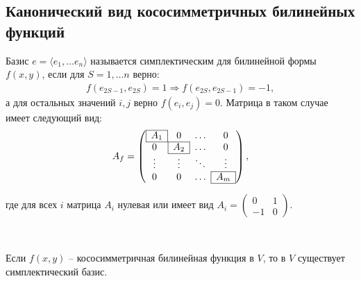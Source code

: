 \subsection{Канонический вид кососимметричных билинейных функций}

\begin{definition}
    Базис $e = \langle e_1, \dots e_n \rangle$ называется симплектическим для билинейной формы $f(x, y)$, 
    если для $S = 1,\dots n$ верно:
    \begin{gather*}
        f(e_{2S - 1}, e_{2S}) = 1 \Rightarrow f(e_{2S}, e_{2S-1}) = -1,
    \end{gather*} а для остальных значений $i, j$ верно $f(e_i, e_j) = 0$. 
    Матрица в таком случае имеет следующий вид: 
    \[A_f = \left(\begin{array}{@{}cccc@{}}
		\cline{1-1}
		\multicolumn{1}{|c|}{A_1} & 0 & \dots & 0\\
		\cline{1-2}
		0 & \multicolumn{1}{|c|}{A_2} & \dots & 0\\
		\cline{2-2}
		\vdots & \vdots & \ddots & \vdots\\
		\cline{4-4}
		0 & 0 & \dots & \multicolumn{1}{|c|}{A_m}\\
		\cline{4-4}
	\end{array}\right),\]
	
	где для всех $i$ матрица $A_i$ нулевая или имеет вид $A_i = 
    \begin{pmatrix}
        0  &1 \\
		-1 &0
    \end{pmatrix}$.
\end{definition}

\begin{theorem}~

    Если $f(x, y)$ -- кососимметричная билинейная функция в $V$, то в $V$ существует симплектический базис.
\end{theorem}

